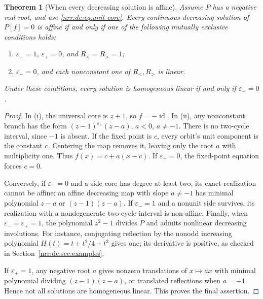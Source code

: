 \documentclass[11pt,letterpaper]{article}
\newtheorem{theorem}{Theorem}[section]
\theoremstyle{definition}
\theoremstyle{remark}
\newcommand{\id}{\operatorname{id}}
\begin{document}
\begin{theorem}[When every decreasing solution is affine]
\label{nrr:dc:thm:affine}
Assume $P$ has a negative real root, and use \eqref{nrr:dc:eq:unit-core}.
Every continuous decreasing solution of $P[f]=0$ is affine if and only
if one of the following mutually exclusive conditions holds:
\begin{enumerate}[label=(\roman*),itemsep=2pt]
\item $\varepsilon_-=1$, $\varepsilon_+=0$, and $R_<=R_>=1$;
\item $\varepsilon_-=0$, and each nonconstant one of $R_<,R_>$ is linear.
\end{enumerate}
Under these conditions, every solution is homogeneous linear if and
only if $\varepsilon_+=0$.
\end{theorem}
\begin{proof}
In (i), the universal core is $z+1$, so $f=-\id$.
In (ii), any nonconstant branch has the form
$(z-1)^{\varepsilon_+}(z-a)$, $a<0$, $a\ne-1$. There is no two-cycle interval,
since $-1$ is absent. If the fixed point is $c$, every orbit's unit
component is the constant $c$. Centering the map removes it, leaving
only the root $a$ with multiplicity one. Thus
$f(x)=c+a(x-c)$. If $\varepsilon_+=0$, the fixed-point equation forces $c=0$.

Conversely, if $\varepsilon_-=0$ and a side core has degree at least two,
its exact realization cannot be affine: an affine decreasing map with
slope $a\ne-1$ has minimal polynomial $z-a$ or $(z-1)(z-a)$.
If $\varepsilon_-=1$ and a nonunit side survives, its realization with a
nondegenerate two-cycle interval is non-affine. Finally, when
$\varepsilon_-=\varepsilon_+=1$, the polynomial $z^2-1$ divides $P$ and admits
nonlinear decreasing involutions. For instance, conjugating reflection
by the nonodd increasing polynomial
$H(t)=t+t^2/4+t^3$ gives one; its derivative is positive, as checked
in Section~\ref{nrr:dc:sec:examples}.

If $\varepsilon_+=1$, any negative root $a$ gives nonzero translations of
$x\mapsto ax$ with minimal polynomial dividing $(z-1)(z-a)$, or
translated reflections when $a=-1$. Hence not all solutions are
homogeneous linear. This proves the final assertion.
\end{proof}
\end{document}
